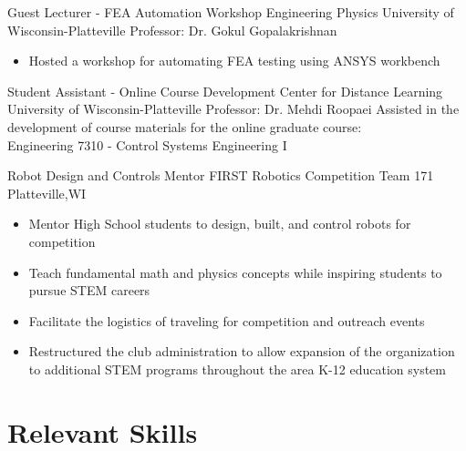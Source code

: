 \documentclass[11pt,letterpaper,roman]{moderncv} %
\begin{document}
{Guest Lecturer - FEA Automation Workshop}
{Engineering Physics}
{University of Wisconsin-Platteville}
{Professor: Dr. Gokul Gopalakrishnan}
{\begin{itemize}
    \item Hosted a workshop for automating FEA testing using ANSYS workbench
\end{itemize}
}

{Student Assistant - Online Course Development}
{Center for Distance Learning}
{University of Wisconsin-Platteville}
{Professor: Dr. Mehdi Roopaei}
{Assisted in the development of course materials for the online graduate course:\\ Engineering 7310 - Control Systems Engineering I}


{Robot Design and Controls Mentor}
{FIRST Robotics Competition Team 171}
{Platteville,WI}{}{
\begin{itemize}
    \item Mentor High School students to design, built, and control robots for competition
    \item Teach fundamental math and physics concepts while inspiring students to pursue STEM careers
    \item Facilitate the logistics of traveling for competition and outreach events
    \item Restructured the club administration to allow expansion of the organization to additional STEM programs throughout the area K-12 education system
\end{itemize}
}



\section{Relevant Skills}
\end{document}
